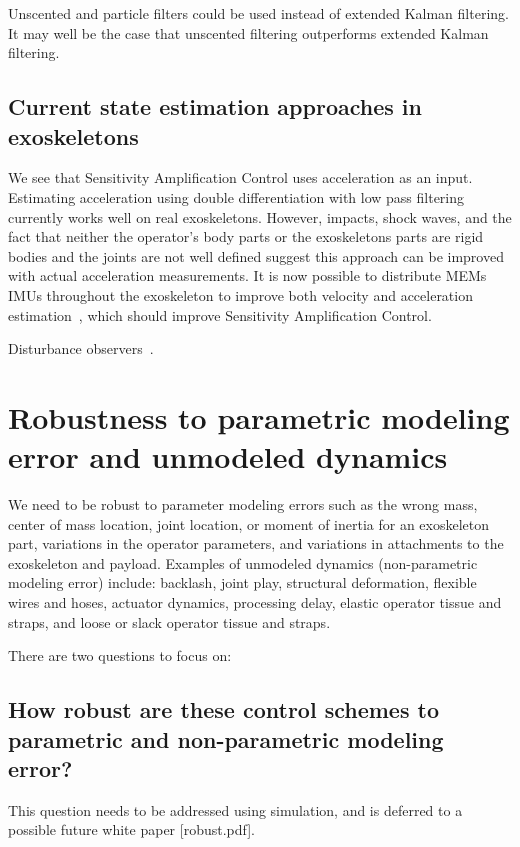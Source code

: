 \documentclass[letterpaper,12pt,fullpage]{article}
\begin{document}
Unscented and particle filters could be used instead of extended
Kalman filtering. It may well be the case that unscented filtering
outperforms extended Kalman filtering.

\subsection{Current state estimation approaches in exoskeletons}

We see that Sensitivity Amplification Control uses acceleration as an input.
Estimating acceleration using double differentiation with low pass filtering
currently works well on real exoskeletons.
However, impacts, shock waves, and the fact that neither
the operator's body parts or the exoskeletons parts are rigid bodies and the
joints are not well defined suggest this approach can be improved with actual
acceleration measurements.
It is now possible to distribute MEMs IMUs throughout the exoskeleton to
improve both velocity and 
acceleration estimation~\cite{Xinjilefu-thesis}, which should improve
Sensitivity Amplification Control.

Disturbance observers~\cite{IEEE06197032}.

\section{Robustness to parametric modeling error and unmodeled dynamics}

We need to be robust to parameter modeling errors such as the wrong mass,
center of mass location, joint location,
or moment of inertia for an exoskeleton part, variations in the operator
parameters, and variations in attachments to the exoskeleton and payload.
Examples of unmodeled dynamics (non-parametric modeling error) include:
backlash, joint play, structural deformation, flexible wires and hoses,
actuator dynamics, processing delay,
elastic operator tissue and straps, and 
loose or slack operator tissue and straps.

There are two questions to focus on:

\subsection{How robust are these control schemes to parametric and non-parametric
modeling error?}

This question needs to be addressed using simulation, and is deferred to a 
possible future white paper [robust.pdf].
\end{document}
